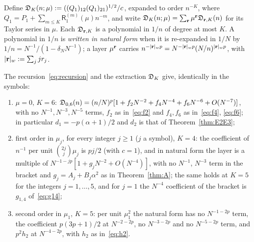 Define $\mathfrak D_K(n;\mu):=((Q_1)_{12}(Q_1)_{21})^{1/2}/c$, expanded to order $n^{-K}$, where
$Q_1=P_1+\sum_{m\le K}\mathsf R_1^{(m)}(\mu)n^{-m}$, and write $\mathfrak D_K(n;\mu)=\sum_{\mathbf r}\mu^{\mathbf r}\mathfrak D_{\mathbf r,K}(n)$ for its
Taylor series in $\mu$. Each $\mathfrak D_{\mathbf r,K}$ is a polynomial in $1/n$ of degree at most $K$. A polynomial in $1/n$ is
\emph{written in natural form} when it is re-expanded in $1/N$ by $1/n=N^{-1}/(1-\delta_NN^{-1})$; a layer $\mu^{\mathbf r}$ carries
$n^{-|\mathbf r|_wp}=N^{-|\mathbf r|_wp}(N/n)^{|\mathbf r|_wp}$, with $|\mathbf r|_w:=\sum_jjr_j$.

\begin{lemma}\label{lem:N6d}
The recursion~\eqref{eq:recursion} and the extraction $\mathfrak D_K$ give, identically in the symbols:
\begin{enumerate}
\item[(a)] $\mu=0$, $K=6$: $\mathfrak D_{0,6}(n)=(n/N)^p[1+f_2N^{-2}+f_4N^{-4}+f_6N^{-6}+O(N^{-7})]$, with no $N^{-1},N^{-3},N^{-5}$
terms, $f_2$ as in~\eqref{eq:f2} and $f_4,f_6$ as in~\eqref{eq:f4}, \eqref{eq:f6}; in particular $d_1=-p(\alpha+1)/2$ and $d_2$ is
that of Theorem~\ref{thm:E2E3};
\item[(b)] first order in $\mu_j$, for every integer $j\ge1$ ($j$ a symbol), $K=4$: the coefficient of $n^{-1}$ per unit
$\binom{2j}j\mu_j$ is $pj/2$ (with $c=1$), and in natural form the layer is a multiple of
$N^{-1-jp}[1+g_jN^{-2}+O(N^{-4})]$, with no $N^{-1}$, $N^{-3}$ term in the bracket and $g_j=A_j+B_j\alpha^2$ as in
Theorem~\ref{thm:A}; the same holds at $K=5$ for the integers $j=1,\dots,5$, and for $j=1$ the $N^{-4}$ coefficient of
the bracket is $g_{1,4}$ of~\eqref{eq:g14};
\item[(c)] second order in $\mu_1$, $K=5$: per unit $\mu_1^2$ the natural form has no $N^{-1-2p}$ term, the coefficient
$p(3p+1)/2$ at $N^{-2-2p}$, no $N^{-3-2p}$ and no $N^{-5-2p}$ term, and $p^2h_2$ at $N^{-4-2p}$, with $h_2$ as in~\eqref{eq:h2}.
\end{enumerate}
\end{lemma}


